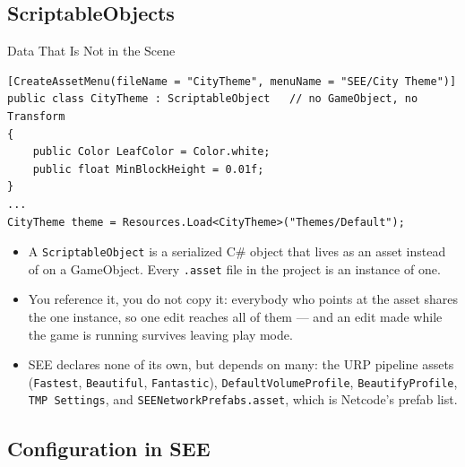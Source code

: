 \subsection{ScriptableObjects}

\begin{frame}[fragile]{Data That Is Not in the Scene}
  \begin{lstlisting}[basicstyle=\scriptsize\ttfamily]
[CreateAssetMenu(fileName = "CityTheme", menuName = "SEE/City Theme")]
public class CityTheme : ScriptableObject   // no GameObject, no Transform
{
    public Color LeafColor = Color.white;
    public float MinBlockHeight = 0.01f;
}
...
CityTheme theme = Resources.Load<CityTheme>("Themes/Default");
  \end{lstlisting}
  \vspace{1ex}

  \begin{itemize}
    \item A \texttt{ScriptableObject} is a serialized C\# object that lives as
      an asset instead of on a GameObject. Every \texttt{.asset} file in the
      project is an instance of one.
    \item You reference it, you do not copy it: everybody who points at the
      asset shares the one instance, so one edit reaches all of them --- and an
      edit made while the game is running survives leaving play mode.
    \item SEE declares none of its own, but depends on many: the URP
      pipeline assets (\texttt{Fastest}, \texttt{Beautiful}, \texttt{Fantastic}),
      \texttt{DefaultVolumeProfile}, \texttt{BeautifyProfile},
      \texttt{TMP Settings}, and \texttt{SEENetworkPrefabs.asset}, which is
      Netcode's prefab list.
  \end{itemize}
\end{frame}

\subsection{Configuration in SEE}

